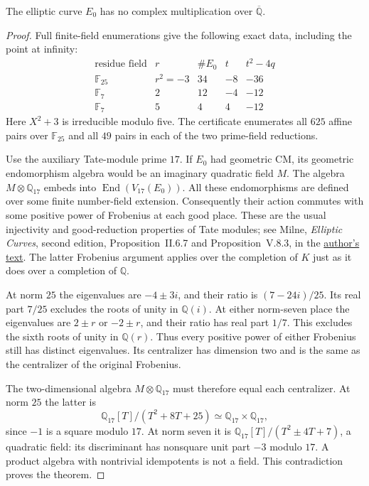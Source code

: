 \begin{theorem}
\label{bs-noncm}
The elliptic curve $E_0$ has no complex multiplication over
$\overline{\mathbb Q}$.
\end{theorem}
\begin{proof}
Full finite-field enumerations give the following exact data,
including the point at infinity:
\[
\begin{array}{c|c|r|r|r}
 \text{residue field}&r&\#E_0&t&t^2-4q\\\hline
 \mathbb F_{25}&r^2=-3&34&-8&-36\\
 \mathbb F_7&2&12&-4&-12\\
 \mathbb F_7&5&4&4&-12
\end{array}
\]
Here $X^2+3$ is irreducible modulo five. The certificate enumerates
all $625$ affine pairs over $\mathbb F_{25}$ and all $49$ pairs in
each of the two prime-field reductions.

Use the auxiliary Tate-module prime $17$. If $E_0$ had geometric
CM, its geometric endomorphism algebra would be an imaginary
quadratic field $M$. The algebra $M\otimes\mathbb Q_{17}$ embeds
into $\operatorname{End}(V_{17}(E_0))$. All these endomorphisms are
defined over some finite number-field extension. Consequently their
action commutes with some positive power of Frobenius at each good
place. These are the usual injectivity and good-reduction properties
of Tate modules; see Milne, \emph{Elliptic Curves}, second edition,
Proposition~II.6.7 and Proposition~V.8.3, in the
\href{https://www.jmilne.org/math/Books/EC2.pdf}{author's text}.
The latter Frobenius argument applies over the completion of $K$
just as it does over a completion of $\mathbb Q$.

At norm $25$ the eigenvalues are $-4\pm3i$, and their ratio is
$(7-24i)/25$. Its real part $7/25$ excludes the roots of unity in
$\mathbb Q(i)$. At either norm-seven place the eigenvalues are
$2\pm r$ or $-2\pm r$, and their ratio has real part $1/7$.
This excludes the sixth roots of unity in $\mathbb Q(r)$. Thus every
positive power of either Frobenius still has distinct eigenvalues.
Its centralizer has dimension two and is the same as the centralizer
of the original Frobenius.

The two-dimensional algebra $M\otimes\mathbb Q_{17}$ must therefore
equal each centralizer. At norm $25$ the latter is
\[
 \mathbb Q_{17}[T]/(T^2+8T+25)
       \simeq\mathbb Q_{17}\times\mathbb Q_{17},
\]
since $-1$ is a square modulo $17$. At norm seven it is
$\mathbb Q_{17}[T]/(T^2\pm4T+7)$, a quadratic field: its
discriminant has nonsquare unit part $-3$ modulo $17$. A product
algebra with nontrivial idempotents is not a field. This contradiction
proves the theorem.
\end{proof}

